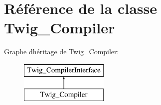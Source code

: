 \hypertarget{class_twig___compiler}{}\section{Référence de la classe Twig\+\_\+\+Compiler}
\label{class_twig___compiler}
Graphe d\textquotesingle{}héritage de Twig\+\_\+\+Compiler\+:\begin{figure}[H]
\begin{center}
\leavevmode
\includegraphics[height=2.000000cm]{class_twig___compiler}
\end{center}
\end{figure}
